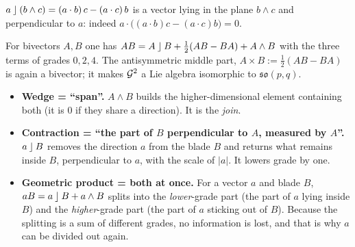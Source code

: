 \begin{example}
$a\mathbin{\rfloor}(b\wedge c)=(a\cdot b)\,c-(a\cdot c)\,b$ is a vector lying in the plane $b\wedge c$ and perpendicular to $a$: indeed $a\cdot\bigl((a\cdot b)c-(a\cdot c)b\bigr)=0$.
\end{example}

\begin{remark}
For bivectors $A,B$ one has $AB=A\mathbin{\rfloor} B+\tfrac12(AB-BA)+A\wedge B$ with the three terms of grades $0,2,4$. The antisymmetric middle part, $A\times B:=\tfrac12(AB-BA)$ is again a bivector; it makes $\mathcal{G}^2$ a Lie algebra isomorphic to $\mathfrak{so}(p,q)$.
\end{remark}

\begin{intuition}
\begin{itemize}
  \item \textbf{Wedge = ``span''.} $A\wedge B$ builds the higher-dimensional element containing both (it is $0$ if they share a direction). It is the \emph{join}.
  \item \textbf{Contraction = ``the part of $B$ perpendicular to $A$, measured by $A$''.} $a\mathbin{\rfloor} B$ removes the direction $a$ from the blade $B$ and returns what remains inside $B$, perpendicular to $a$, with the scale of $|a|$. It lowers grade by one.
  \item \textbf{Geometric product = both at once.} For a vector $a$ and blade $B$, $aB=a\mathbin{\rfloor} B+a\wedge B$ splits into the \emph{lower}-grade part (the part of $a$ lying inside $B$) and the \emph{higher}-grade part (the part of $a$ sticking out of $B$). Because the splitting is a sum of different grades, no information is lost, and that is why $a$ can be divided out again.
\end{itemize}
\end{intuition}
